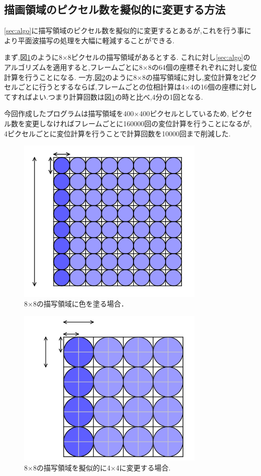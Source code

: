 \subsection{描画領域のピクセル数を擬似的に変更する方法}
\ref{sec:algo}に描写領域のピクセル数を擬似的に変更するとあるが,これを行う事により平面波描写の処理を大幅に軽減することができる.

まず,図\ref{fig:pxcelone}のように8×8ピクセルの描写領域があるとする.
これに対し\ref{sec:algo}のアルゴリズムを適用すると,フレームごとに8×8の64個の座標それぞれに対し変位計算を行うことになる.
一方,図\ref{fig:pxceltwo}のように8×8の描写領域に対し,変位計算を2ピクセルごとに行うとするならば,フレームごとの位相計算は4×4の16個の座標に対してすればよい.つまり計算回数は図\ref{fig:pxcelone}の時と比べ,4分の1回となる.

今回作成したプログラムは描写領域を400×400ピクセルとしているため,
ピクセル数を変更しなければフレームごとに160000回の変位計算を行うことになるが,
4ピクセルごとに変位計算を行うことで計算回数を10000回まで削減した.

\begin{figure}[H]
 \begin{center}
  \includegraphics[width=90mm]{../implement/1pxcel.png}
 \end{center}
 \caption{8$×$8の描写領域に色を塗る場合．}
 \label{fig:pxcelone}
\end{figure}


\begin{figure}[H]
 \begin{center}
  \includegraphics[width=90mm]{../implement/2pxcel.png}
 \end{center}
 \caption{8$×$8の描写領域を擬似的に4$×$4に変更する場合.}
 \label{fig:pxceltwo}
\end{figure}


